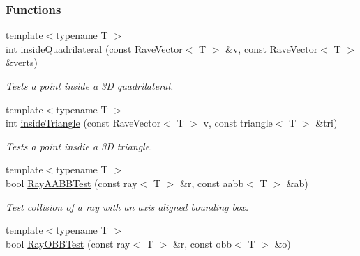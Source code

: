 \subsubsection*{Functions}
\begin{DoxyCompactItemize}
\item 
\hypertarget{group__geometric__primitives_ga3264b6e233d1bacaa2176bf9e7a74399}{
{\footnotesize template$<$typename T $>$ }\\int \hyperlink{group__geometric__primitives_ga3264b6e233d1bacaa2176bf9e7a74399}{insideQuadrilateral} (const RaveVector$<$ T $>$ \&v, const RaveVector$<$ T $>$ \&verts)}
\label{group__geometric__primitives_ga3264b6e233d1bacaa2176bf9e7a74399}

\begin{DoxyCompactList}\small\item\em Tests a point inside a 3D quadrilateral. \item\end{DoxyCompactList}\item 
\hypertarget{group__geometric__primitives_gafa7d69f62abeb6dcb2784b10ad6ef8a5}{
{\footnotesize template$<$typename T $>$ }\\int \hyperlink{group__geometric__primitives_gafa7d69f62abeb6dcb2784b10ad6ef8a5}{insideTriangle} (const RaveVector$<$ T $>$ v, const triangle$<$ T $>$ \&tri)}
\label{group__geometric__primitives_gafa7d69f62abeb6dcb2784b10ad6ef8a5}

\begin{DoxyCompactList}\small\item\em Tests a point insdie a 3D triangle. \item\end{DoxyCompactList}\item 
\hypertarget{group__geometric__primitives_ga1c4f9c919f34e3f44e4dbe3fd4abfb8e}{
{\footnotesize template$<$typename T $>$ }\\bool \hyperlink{group__geometric__primitives_ga1c4f9c919f34e3f44e4dbe3fd4abfb8e}{RayAABBTest} (const ray$<$ T $>$ \&r, const aabb$<$ T $>$ \&ab)}
\label{group__geometric__primitives_ga1c4f9c919f34e3f44e4dbe3fd4abfb8e}

\begin{DoxyCompactList}\small\item\em Test collision of a ray with an axis aligned bounding box. \item\end{DoxyCompactList}\item 
\hypertarget{group__geometric__primitives_gabd242edf62b381f793017cce0f2bec93}{
{\footnotesize template$<$typename T $>$ }\\bool \hyperlink{group__geometric__primitives_gabd242edf62b381f793017cce0f2bec93}{RayOBBTest} (const ray$<$ T $>$ \&r, const obb$<$ T $>$ \&o)}
\label{group__geometric__primitives_gabd242edf62b381f793017cce0f2bec93}


\end{DoxyCompactItemize}
